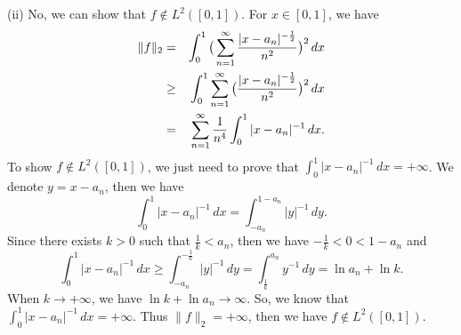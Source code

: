 \documentclass[12pt,a4paper]{ctexart}
\begin{document}
(ii) No, we can show that $f \notin L^{2}([0,1])$. For $x \in [0, 1]$, we have
\begin{eqnarray*}
\|f\|_{2} & =& \int_{0}^{1} \big{(} \sum_{n = 1}^{\infty} \frac{|x - a_{n}|^{- \frac{1}{2}}}{n^{2}}\big{)}^{2}  \, d x  \\
& \geq & \int_{0}^{1} \sum_{n = 1}^{\infty} \big{(} \frac{|x - a_{n}|^{- \frac{1}{2}}}{n^{2}}\big{)}^{2}  \, d x  \\
& = & \sum_{n = 1}^{\infty} \frac{1}{n^{4}} \int_{0}^{1} |x - a_{n}|^{-1} \, d x .
\end{eqnarray*}
To show $f \notin L^{2}([0,1])$, we just need to prove that $\int_{0}^{1} |x - a_{n}|^{-1} \, d x = + \infty$. We denote $y = x - a_{n}$, then we have
\begin{equation*}
   \int_{0}^{1} |x - a_{n}|^{-1} \, d x = \int_{-a_{n}}^{1 - a_{n}} |y|^{-1} \, d y.
\end{equation*}
Since there exists $k > 0$ such that $\frac{1}{k} < a_{n}$, then we have $- \frac{1}{k} < 0 < 1 - a_{n}$ and
\begin{equation*}
   \int_{0}^{1} |x - a_{n}|^{-1} \, d x \geq \int_{-a_{n}}^{- \frac{1}{k}} |y|^{-1} \, d y = \int_{\frac{1}{k}}^{a_{n}} y^{-1} \, d y = \ln a_{n} + \ln k.
\end{equation*}
When $k \to + \infty$, we have $\ln k+ \ln a_{n} \to \infty$. So, we know that $\int_{0}^{1} |x - a_{n}|^{-1} \, d x = + \infty$. Thus $\|f\|_{2} = + \infty$, then we have $f \notin L^{2}([0,1])$.
\end{document}
